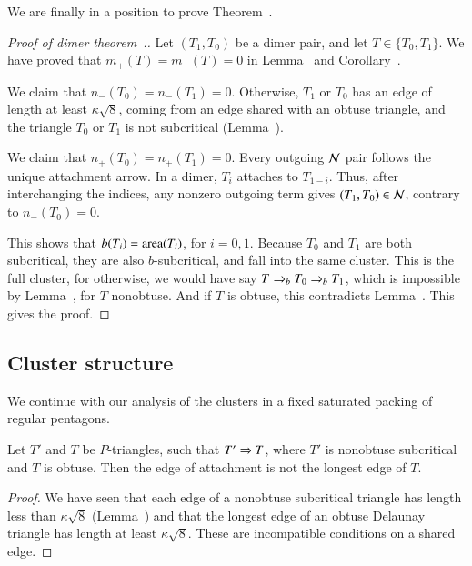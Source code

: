 We are finally in a position to prove Theorem~.

\begin{proof}[Proof of dimer theorem~.]
  Let $(T_1,T_0)$ be a dimer pair, and let $T\in \{T_0,T_1\}$.  We
  have proved that $m_+(T)=m_-(T)=0$ in Lemma~ and
  Corollary~.

  We claim that $n_-(T_0)=n_-(T_1)=0$.  Otherwise, $T_1$ or $T_0$ has
  an edge of length at least $\kappa\sqrt8$, coming from an edge
  shared with an obtuse triangle, and the triangle $T_0$ or $T_1$ is
  not subcritical (Lemma~).

  We claim that $n_+(T_0)=n_+(T_1)=0$.  Every outgoing $\mathcal N$
  pair follows the unique attachment arrow.  In a dimer, $T_i$
  attaches to $T_{1-i}$.  Thus, after interchanging the indices,
  any nonzero outgoing term gives $(T_1,T_0)\in\mathcal N$, contrary
  to $n_-(T_0)=0$.

  This shows that $b(T_i)={\operatorname{area}}(T_i)$, for $i=0,1$.  Because $T_0$ and
  $T_1$ are both subcritical, they are also $b$-subcritical, and fall
  into the same cluster.  This is the full cluster, for otherwise, we
  would have say $T\Rightarrow_{b} T_0\Rightarrow_{b} T_1$, which is impossible by
  Lemma~, for $T$ nonobtuse.  And if $T$ is
  obtuse, this contradicts Lemma~.
  This gives the proof.
\end{proof}

\subsection{Cluster structure}

We continue with our analysis of the clusters in a fixed saturated
packing of regular pentagons.  

\begin{lemma}  
  Let $T'$ and $T$ be $P$-triangles, such that $T'\Rightarrow T$, where
  $T'$ is nonobtuse subcritical and $T$ is obtuse.  Then the edge
  of attachment is not the longest edge of $T$.
\end{lemma}

\begin{proof} We have seen that each edge of a nonobtuse subcritical
  triangle has length less than $\kappa\sqrt8$ (Lemma~) and that the longest
  edge of an obtuse Delaunay triangle has length at least
  $\kappa\sqrt{8}$.  These are incompatible conditions on a shared
  edge.
\end{proof}

